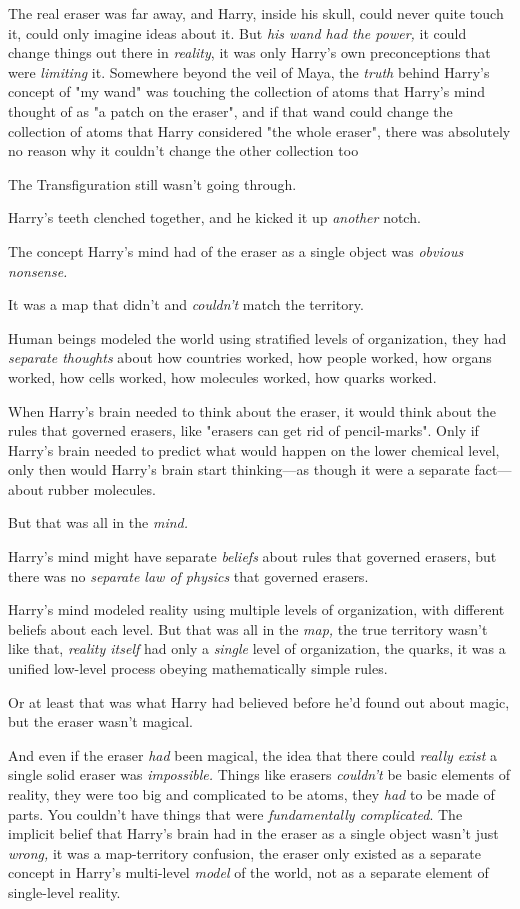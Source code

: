 The real eraser was far away, and Harry, inside his skull, could never quite
touch it, could only imagine ideas about it. But \emph{his wand had the power,}
it could change things out there in \emph{reality}, it was only Harry's own
preconceptions that were \emph{limiting} it. Somewhere beyond the veil of Maya,
the \emph{truth} behind Harry's concept of "my wand" was touching the
collection of atoms that Harry's mind thought of as "a patch on the eraser",
and if that wand could change the collection of atoms that Harry considered
"the whole eraser", there was absolutely no reason why it couldn't change the
other collection too{\el}

The Transfiguration still wasn't going through.

Harry's teeth clenched together, and he kicked it up \emph{another} notch.

The concept Harry's mind had of the eraser as a single object was \emph{obvious
nonsense.}

It was a map that didn't and \emph{couldn't} match the territory.

Human beings modeled the world using stratified levels of organization, they
had \emph{separate thoughts} about how countries worked, how people worked, how
organs worked, how cells worked, how molecules worked, how quarks worked.

When Harry's brain needed to think about the eraser, it would think about the
rules that governed erasers, like "erasers can get rid of pencil-marks". Only
if Harry's brain needed to predict what would happen on the lower chemical
level, only then would Harry's brain start thinking---as though it were a
separate fact---about rubber molecules.

But that was all in the \emph{mind.}

Harry's mind might have separate \emph{beliefs} about rules that governed
erasers, but there was no \emph{separate law of physics} that governed erasers.

Harry's mind modeled reality using multiple levels of organization, with
different beliefs about each level. But that was all in the \emph{map,} the
true territory wasn't like that, \emph{reality itself} had only a \emph{single}
level of organization, the quarks, it was a unified low-level process obeying
mathematically simple rules.

Or at least that was what Harry had believed before he'd found out about magic,
but the eraser wasn't magical.

And even if the eraser \emph{had} been magical, the idea that there could
\emph{really exist} a single solid eraser was \emph{impossible.} Things like
erasers \emph{couldn't} be basic elements of reality, they were too big and
complicated to be atoms, they \emph{had} to be made of parts. You
couldn't have things that were \emph{fundamentally complicated}. The implicit
belief that Harry's brain had in the eraser as a single object wasn't just
\emph{wrong,} it was a map-territory confusion, the eraser only existed as a
separate concept in Harry's multi-level \emph{model} of the world, not as a
separate element of single-level reality.

